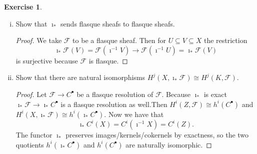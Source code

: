 \documentclass{article}
\newcommand{\FF}{\mathcal{F}}
\newcommand{\incl}{\imath}
\theoremstyle{definition}
\newtheorem{question}{Exercise}
\begin{document}
\begin{question}
\begin{enumerate}[(i)]
        \item Show that \(\incl_{*}\) sends flasque sheafs to flasque sheafs.

              \begin{proof}
                  We take \(\FF\) to be a flasque sheaf. Then for \(U\subseteq
                  V\subseteq X\) the restriction
                  \[
                      \incl_{*}\FF(V)=\FF(\incl^{-1}V)\to\FF(\incl^{-1}U)=\incl_{*}\FF(V)
                  \]
                  is surjective because \(\FF\) is flasque.
              \end{proof}

        \item Show that there are natural isomorphisms
              \(H^{j}(X,\incl_{*}\FF)\cong H^{j}(K,\FF)\).

              \begin{proof}
                  Let \(\FF\to C^{\bullet}\) be a flasque resolution of \(\FF\).
                  Because \(\incl_{*}\) is exact
                  \(\incl_{*}\FF\to\incl_{*}C^{\bullet}\) is a flasque
                  resolution as well.Then \(H^{i}(Z,\FF)\cong
                  h^{i}(C^{\bullet})\) and \(H^{i}(X,\incl_{*}\FF)\cong
                  h^{i}(\incl_{*}C^{\bullet})\). Now we have
                  that
                  \[
                      \incl_{*}C^{i}(X)=C^{i}(\imath^{-1}X)=C^{i}(Z).
                  \]
                  The functor \(\incl_{*}\) preserves images/kernels/cokernels
                  by exactness, so the two quotients
                  \(h^{i}(\incl_{*}C^{\bullet})\) and \(h^{i}(C^{\bullet})\) are
                  naturally isomorphic.
              \end{proof}
    \end{enumerate}
\end{question}
\end{document}
